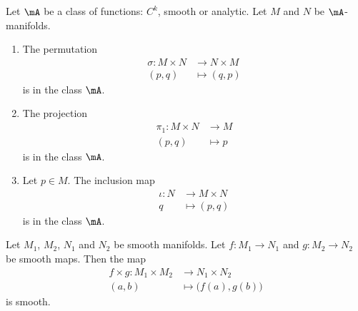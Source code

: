 \begin{proposition}      \label{PROPooCHVLooVFScOl}
	Let \( \mA\) be a class of functions: \( C^k\), smooth or analytic.  Let \( M\) and \( N\) be \( \mA\)-manifolds.
	\begin{enumerate}
		\item
		      The permutation
		      \begin{equation}
			      \begin{aligned}
				      \sigma\colon M\times N & \to N\times M \\
				      (p,q)                  & \mapsto (q,p)
			      \end{aligned}
		      \end{equation}
		      is in the class \( \mA\).
		\item       \label{ITEMooRFFAooRSeBPl}
		      The projection
		      \begin{equation}
			      \begin{aligned}
				      \pi_1\colon M\times N & \to M     \\
				      (p,q)                 & \mapsto p
			      \end{aligned}
		      \end{equation}
		      is in the class \( \mA\).
		\item
		      Let \( p\in M\). The inclusion map
		      \begin{equation}
			      \begin{aligned}
				      \iota\colon N & \to M\times N \\
				      q             & \mapsto (p,q)
			      \end{aligned}
		      \end{equation}
		      is in the class \( \mA\).
	\end{enumerate}
\end{proposition}

\begin{proposition}	\label{PROPooXFUTooCNzDHf}
	Let \( M_1\), \( M_2\), \( N_1\) and \( N_2\) be smooth manifolds. Let \(f \colon M_1\to N_1  \) and \(g \colon M_2\to N_2  \) be smooth maps. Then the map
	\begin{equation}
		\begin{aligned}
			f\times g\colon M_1\times M_2 & \to N_1\times N_2              \\
			(a,b)                         & \mapsto \big( f(a), g(b) \big)
		\end{aligned}
	\end{equation}
	is smooth.
\end{proposition}


